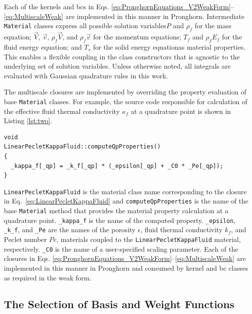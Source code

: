 Each of the kernels and \glspl{bc} in Eqs. \eqref{eq:PronghornEquations_V2WeakForm}--\eqref{eq:MultiscaleWeak} are implemented in this manner in Pronghorn. Intermediate \texttt{Material} classes express all possible solution variables\mdash \(P\) and \(\rho_f\) for the mass equation; \(\vec{V}\), \(\vec{v}\), \(\rho_f\vec{V}\), and \(\rho_f\vec{v}\) for the momentum equations; \(T_f\) and \(\rho_fE_f\) for the fluid energy equation; and \(T_s\) for the solid energy equation\mdash as material properties. This enables a flexible coupling in the class constructors that is agnostic to the underlying set of solution variables. Unless otherwise noted, all integrals are evaluated with Gaussian quadrature rules in this work.

The multiscale closures are implemented by overriding the property evaluation of base \texttt{Material} classes. For example, the source code responsible for calculation of the effective fluid thermal conductivity \(\kappa_f\) at a quadrature point is shown in Listing \ref{lst:two}.

\vspace{1em}
\begin{minipage}[c]{0.92\linewidth}
\begin{lstlisting}[caption={Pronghorn source code evaluation of \(\kappa_f\) by Eq.\ \eqref{eq:LinearPecletKappaFluid}.}, captionpos=b,label={lst:two}]
void
LinearPecletKappaFluid::computeQpProperties()
{
  _kappa_f[_qp] = _k_f[_qp] * (_epsilon[_qp] + _C0 * _Pe[_qp]);
}
\end{lstlisting}
\end{minipage}

\texttt{LinearPecletKappaFluid} is the material class name corresponding to the closure in Eq.\ \eqref{eq:LinearPecletKappaFluid} and \texttt{computeQpProperties} is the name of the base \texttt{Material} method that provides the material property calculation at a quadrature point. \texttt{\_kappa\_f} is the name of the computed property. \texttt{\_epsilon}, \texttt{\_k\_f}, and \texttt{\_Pe} are the names of the porosity \(\epsilon\), fluid thermal conductivity \(k_f\), and Peclet number \(Pe\), materials coupled to the \texttt{LinearPecletKappaFluid} material, respectively. \texttt{\_C0} is the name of a user-specified scaling parameter. Each of the closures in Eqs. \eqref{eq:PronghornEquations_V2WeakForm}--\eqref{eq:MultiscaleWeak} are implemented in this manner in Pronghorn and consumed by kernel and \gls{bc} classes as required in the weak form.

\subsection{The Selection of Basis and Weight Functions}
\label{sec:basis}

